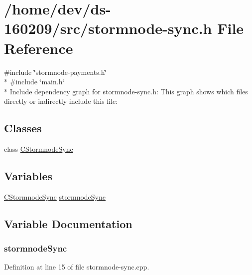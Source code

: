 \hypertarget{stormnode-sync_8h}{}\section{/home/dev/ds-\/160209/src/stormnode-\/sync.h File Reference}
\label{stormnode-sync_8h}
{\ttfamily \#include \char`\"{}stormnode-\/payments.\+h\char`\"{}}\\*
{\ttfamily \#include \char`\"{}main.\+h\char`\"{}}\\*
Include dependency graph for stormnode-\/sync.h\+:
This graph shows which files directly or indirectly include this file\+:
\subsection*{Classes}
\begin{DoxyCompactItemize}
\item 
class \hyperlink{class_c_stormnode_sync}{C\+Stormnode\+Sync}
\end{DoxyCompactItemize}
\subsection*{Variables}
\begin{DoxyCompactItemize}
\item 
\hyperlink{class_c_stormnode_sync}{C\+Stormnode\+Sync} \hyperlink{stormnode-sync_8h_a4233fda53cfb60fd6ba208d981ac3fe7}{stormnode\+Sync}
\end{DoxyCompactItemize}


\subsection{Variable Documentation}
\hypertarget{stormnode-sync_8h_a4233fda53cfb60fd6ba208d981ac3fe7}{}
\subsubsection[{stormnode\+Sync}]{ stormnode\+Sync}\label{stormnode-sync_8h_a4233fda53cfb60fd6ba208d981ac3fe7}


Definition at line 15 of file stormnode-\/sync.\+cpp.

